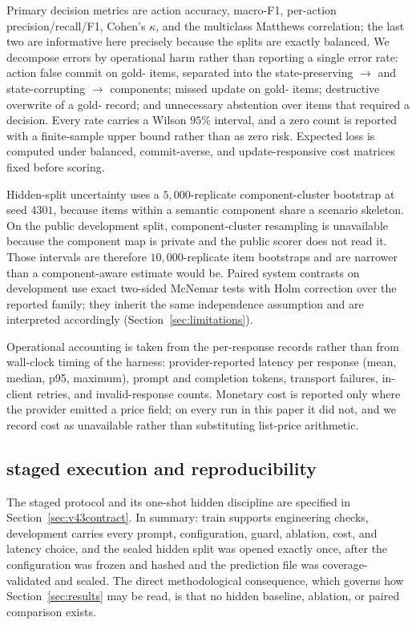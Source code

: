 Primary decision metrics are action accuracy, macro-F1, per-action
precision/recall/F1, Cohen's $\kappa$, and the multiclass Matthews correlation;
the last two are informative here precisely because the splits are exactly
balanced. We decompose errors by operational harm rather than reporting a single
error rate: action false commit on gold-\abstain{} items, separated into the
state-preserving \abstain$\to$\keep{} and state-corrupting
\abstain$\to$\supersede{} components; missed update on gold-\supersede{} items;
destructive overwrite of a gold-\keep{} record; and unnecessary abstention over
items that required a decision. Every rate carries a Wilson $95\%$ interval, and
a zero count is reported with a finite-sample upper bound rather than as zero
risk. Expected loss is computed under balanced, commit-averse, and
update-responsive cost matrices fixed before scoring.

Hidden-split uncertainty uses a $5{,}000$-replicate component-cluster bootstrap
at seed $4301$, because items within a semantic component share a scenario
skeleton. On the public development split, component-cluster resampling is
unavailable because the component map is private and the public scorer does not
read it. Those intervals are therefore $10{,}000$-replicate item bootstraps and are
narrower than a component-aware estimate would be. Paired system contrasts on
development use exact two-sided McNemar tests with Holm correction over the
reported family; they inherit the same independence assumption and are
interpreted accordingly (Section~\ref{sec:limitations}).

Operational accounting is taken from the per-response records rather than
from wall-clock timing of the harness: provider-reported latency per response
(mean, median, p95, maximum), prompt and completion tokens, transport failures,
in-client retries, and invalid-response counts. Monetary cost is reported only
where the provider emitted a price field; on every run in this paper it did
not, and we record cost as unavailable rather than substituting list-price
arithmetic.

\subsection{\mgpc{} staged execution and reproducibility}

The staged protocol and its one-shot hidden discipline are specified in
Section~\ref{sec:v43contract}. In summary: train supports engineering checks,
development carries every prompt, configuration, guard, ablation, cost, and
latency choice, and the sealed hidden split was opened exactly once, after the
configuration was frozen and hashed and the prediction file was
coverage-validated and sealed. The direct methodological consequence, which
governs how Section~\ref{sec:results} may be read, is that no hidden baseline,
ablation, or paired comparison exists.
